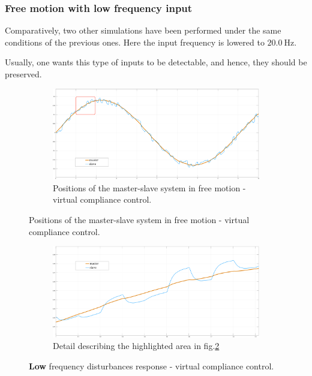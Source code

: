 \subsubsection{Free motion with low frequency input}

Comparatively, two other simulations have been performed under the same
conditions of the previous ones. Here the input frequency is lowered to $20.0 \ \text{Hz}$.

Usually, one wants this type of inputs to be detectable, and hence, they should be preserved. 

\begin{figure}[h]
	\begin{subfigure}{1\linewidth}
		\centering
		\includegraphics[width=\textwidth, height=0.48\textwidth]{Images/freeSet20Tot20HtznoiseRect}
		\caption{Positions of the master-slave system in free motion - virtual compliance control.}
		\label{fig:freeSetTot20HR}
	\end{subfigure}
\end{figure}
\begin{figure}[h]\ContinuedFloat
	\begin{subfigure}{1\linewidth}
		\centering
		\includegraphics[width=\textwidth, height=0.48\textwidth]{Images/freeSet20Part20Htznoise}
		\caption{Detail describing the highlighted area in fig.\ref{fig:freeSetTot20HR}}
		\label{fig:freeSetPar20HR}
	\end{subfigure}	
	\caption{\textbf{Low} frequency disturbances response - virtual compliance control.}
\end{figure}

